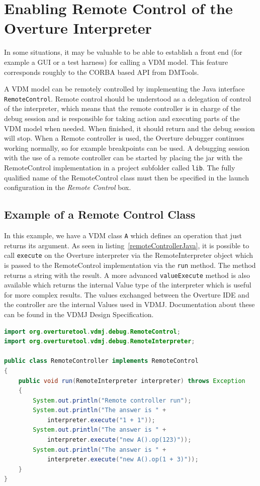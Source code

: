 \documentclass{overturerepchap}
\begin{document}
\chapter{Enabling Remote Control of the Overture
  Interpreter}\label{sec:remote}

In some situations, it may be valuable to be able to establish a
front end (for example a GUI or a test harness) for calling a VDM model.
This feature corresponds roughly to the CORBA based API from
 DMTools\cite{APIMan}.

A VDM model can be remotely controlled by implementing the Java interface
\texttt{RemoteControl}. Remote control should be understood as a
delegation of control of the interpreter, which means that the remote
controller is in charge of the debug session and is responsible for taking
action and executing parts of the VDM model when needed. When finished, it should
return and the debug session will stop. When a Remote controller is
used, the Overture debugger continues working normally, so for example
breakpoints can be used. A debugging session with the use of a remote
controller can be started by placing the jar with the RemoteControl implementation
in a project subfolder called \texttt{lib}. The fully
qualified name of the RemoteControl class must then be specified in the
launch configuration in the \textit{Remote Control} box.

\section{Example of a Remote Control Class}

In this example, we have a VDM class \texttt{A} which defines an operation
that just returns its argument. As
seen in listing~\ref{remoteControllerJava}, it is possible to call
\texttt{execute} on the Overture interpreter via the RemoteInterpreter object
which is passed to the RemoteControl implementation via the \texttt{run} method.
The method returns a string with the result. A more
advanced \texttt{valueExecute} method is also available which returns the internal
Value type of the interpreter which is useful for more complex
results. The values exchanged between the Overture IDE and the 
controller are the internal Values used in VDMJ. Documentation about these
can be found in the VDMJ Design Specification\cite{Battle10}.

\begin{lstlisting}[language=JAVA,label=remoteControllerJava,caption=Remote Controller Java class,captionpos=b]
import org.overturetool.vdmj.debug.RemoteControl;
import org.overturetool.vdmj.debug.RemoteInterpreter;

public class RemoteController implements RemoteControl
{
	public void run(RemoteInterpreter interpreter) throws Exception
	{
		System.out.println("Remote controller run");
		System.out.println("The answer is " + 
			interpreter.execute("1 + 1")); 
		System.out.println("The answer is " + 
			interpreter.execute("new A().op(123)")); 
		System.out.println("The answer is " + 
			interpreter.execute("new A().op(1 + 3)")); 
	}
}
\end{lstlisting}
\end{document}
